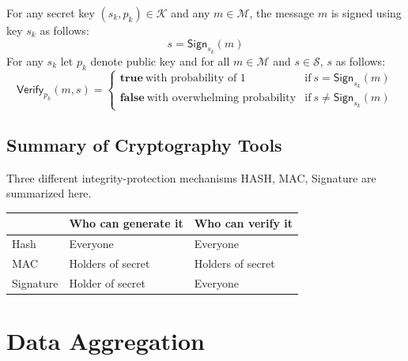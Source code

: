 \documentclass[%
  slidesonly,%
  semlayer%
  ]{seminar}                                  %
\begin{document}
\begin{slide}
    For any secret key $(s_{k}, p_{k}) \in \mathcal{K}$ and any $m \in \mathcal{M}$, the message $m$ is signed using key $s_{k}$ as follows:
      \begin{equation*}
        s = \textsf{Sign}_{s_{k}}(m)
        \label{eq:signature}
      \end{equation*}
    For any $s_{k}$ let $p_{k}$ denote public key and for all $m \in \mathcal{M}$ and $s \in \mathcal{S}$, $s$ as follows:
    \begin{equation*}
      \textsf{Verify}_{p_{k}}(m,s) = 
      \begin{cases}
       \textbf{true}\ \mbox{with probability of 1} & \mbox{if}\ s = \textsf{Sign}_{s_{k}}(m)\\
       \textbf{false}\ \mbox{with overwhelming probability} & \mbox{if}\ s \neq \textsf{Sign}_{s_{k}}(m)
      \end{cases}
      \label{eq:verification}
    \end{equation*}
    \vfill
    \clearpage

  \subsection*{Summary of Cryptography Tools}
    \vspace{0.3in}
    Three different integrity-protection mechanisms HASH, MAC, Signature are summarized here.
    \begin{table}[!htb]
      \tiny
      \begin{center}
        \begin{tabular}{ |l || l| l| }
          \hline
           & Who can generate it & Who can verify it \\
          \hline
          Hash & Everyone & Everyone \\ 
          \hline
          MAC & Holders of secret & Holders of secret \\
          \hline
          Signature & Holder of secret & Everyone \\
          \hline
        \end{tabular}
      \end{center}
    \end{table}
    \vfill
    \clearpage

\section*{Data Aggregation}
  \vspace{0.3in}


\end{slide}
\end{document}
